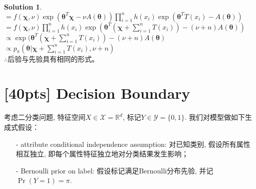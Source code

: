 \documentclass[a4paper,UTF8]{article}
\numberwithin{equation}{section}
\theoremstyle{definition}
\newtheorem*{solution}{Solution}
\begin{document}
\begin{solution}
$= f(\boldsymbol\chi,\nu)\exp(\boldsymbol\theta^T\boldsymbol\chi-\nu A(\boldsymbol\theta)) \prod_{i=1}^n h(x_i)\exp(\boldsymbol\theta^T T(x_i) - A(\boldsymbol\theta)) $\\
$= f(\boldsymbol\chi,\nu) \prod_{i=1}^n h(x_i) \exp(\boldsymbol\theta^T(\boldsymbol\chi + \sum_{i=1}^n T(x_i) ) -(\nu+n)A(\boldsymbol\theta) )$\\
$\propto \exp(\boldsymbol\theta^T(\boldsymbol\chi + \sum_{i=1}^n T(x_i)) -(\nu+n)A(\boldsymbol\theta)$\\
$\propto p_{\pi} (\boldsymbol\theta | \boldsymbol\chi + \sum_{i=1}^n T(x_i), \nu+n)$\\
$\therefore$后验与先验具有相同的形式。\\
\end{solution}

\newpage
\section{[40pts] Decision Boundary}
考虑二分类问题, 特征空间$X \in \mathcal{X}= \mathbb{R}^d$, 标记$Y \in \mathcal{Y}= \{0, 1\}$. 我们对模型做如下生成式假设：
\begin{itemize}
\item[-] attribute conditional independence assumption: 对已知类别, 假设所有属性相互独立, 即每个属性特征独立地对分类结果发生影响；
\item[-] Bernoulli prior on label: 假设标记满足Bernoulli分布先验, 并记$\Pr(Y=1) = \pi$. 
\end{itemize}
\end{document}
